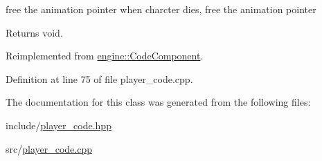 free the animation pointer when charcter dies, free the animation pointer 

\begin{DoxyReturn}{Returns}
\textquotesingle{}void\textquotesingle{}. 
\end{DoxyReturn}


Reimplemented from \hyperlink{classengine_1_1_code_component_af76ba17f9f87216418081d1e2c7c3a22}{engine\+::\+Code\+Component}.



Definition at line 75 of file player\+\_\+code.\+cpp.



The documentation for this class was generated from the following files\+:\begin{DoxyCompactItemize}
\item 
include/\hyperlink{player__code_8hpp}{player\+\_\+code.\+hpp}\item 
src/\hyperlink{player__code_8cpp}{player\+\_\+code.\+cpp}\end{DoxyCompactItemize}
